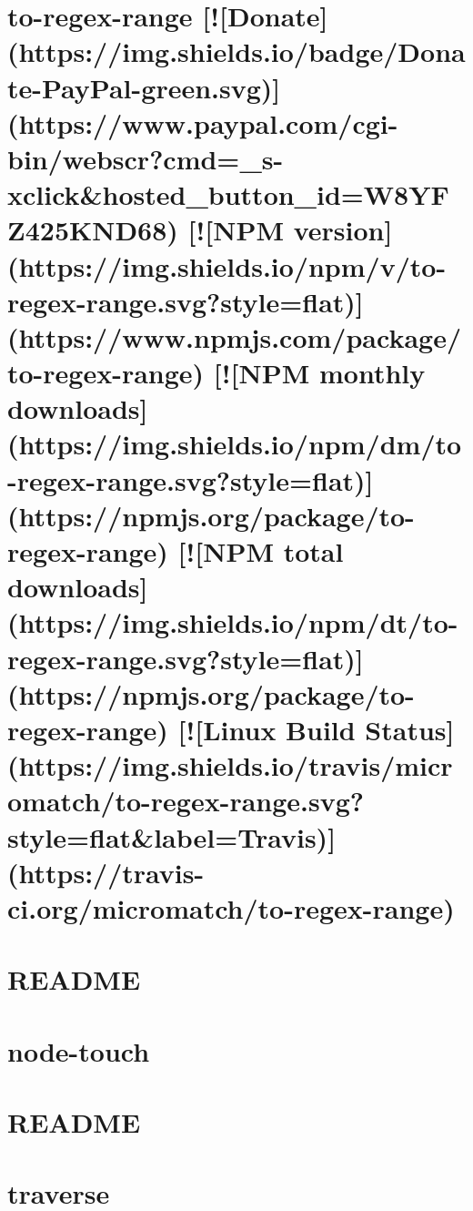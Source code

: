 \documentclass[twoside]{book}
\newcommand{\+}{\discretionary{\mbox{\scriptsize$\hookleftarrow$}}{}{}}
\begin{document}
\chapter{to-\/regex-\/range \mbox{[}!\mbox{[}Donate\mbox{]}(https\+://img.shields.\+io/badge/\+Donate-\/\+Pay\+Pal-\/green.svg)\mbox{]}(https\+://www.paypal.\+com/cgi-\/bin/webscr?cmd=\+\_\+s-\/xclick\&hosted\+\_\+button\+\_\+id=W8\+Y\+F\+Z425\+K\+N\+D68) \mbox{[}!\mbox{[}N\+PM version\mbox{]}(https\+://img.shields.\+io/npm/v/to-\/regex-\/range.svg?style=flat)\mbox{]}(https\+://www.npmjs.\+com/package/to-\/regex-\/range) \mbox{[}!\mbox{[}N\+PM monthly downloads\mbox{]}(https\+://img.shields.\+io/npm/dm/to-\/regex-\/range.svg?style=flat)\mbox{]}(https\+://npmjs.org/package/to-\/regex-\/range) \mbox{[}!\mbox{[}N\+PM total downloads\mbox{]}(https\+://img.shields.\+io/npm/dt/to-\/regex-\/range.svg?style=flat)\mbox{]}(https\+://npmjs.org/package/to-\/regex-\/range) \mbox{[}!\mbox{[}Linux Build Status\mbox{]}(https\+://img.shields.\+io/travis/micromatch/to-\/regex-\/range.svg?style=flat\&label=Travis)\mbox{]}(https\+://travis-\/ci.org/micromatch/to-\/regex-\/range)}
\label{md_dsmacc_examples_DRmerge_node_modules_to-regex-range_README}

\chapter{R\+E\+A\+D\+ME}
\label{md_dsmacc_examples_DRmerge_node_modules_touch_node_modules_nopt_README}

\chapter{node-\/touch}
\label{md_dsmacc_examples_DRmerge_node_modules_touch_README}

\chapter{R\+E\+A\+D\+ME}
\label{md_dsmacc_examples_DRmerge_node_modules_tough-cookie_README}

\chapter{traverse}
\label{md_dsmacc_examples_DRmerge_node_modules_traverse_README}

\end{document}
